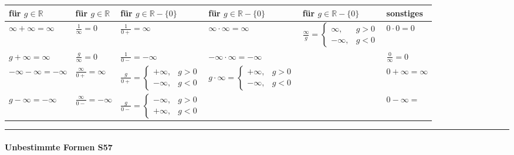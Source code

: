 		\begin{tabulary}{.5\textwidth}{L|L|L|L|L|L}
			für $g\in \mathbb R$	&	für $g\in \mathbb R$	&	für $g\in \mathbb R-\{0\}$	&	für $g\in \mathbb R-\{0\}$	&	für $g\in \mathbb R-\{0\}$ & sonstiges\\ \hline
			$\infty+\infty=\infty$	&$\frac{1}{\infty}=0$		&	$\frac{1}{0+}=\infty$& $\infty\cdot \infty=\infty$& $\frac{\infty}{g}= {\begin{cases} \infty, & g>0 \\ -\infty,& g<0 \end{cases}}$ & $0 \cdot 0 = 0$\\ 
						
			$g+\infty=\infty$		&$\frac{g}{\infty}=0$		&	$\frac{1}{0-}=-\infty$& $-\infty\cdot \infty=-\infty$ & & $\frac{0}{\infty} = 0$\\
			$-\infty-\infty=-\infty$&$\frac{\infty}{0+}=\infty$	& $\frac{g}{0+}= \begin{cases} +\infty, & g>0 \\ -\infty,& g<0 \end{cases}$ &
			$g\cdot \infty= \begin{cases} +\infty, & g>0 \\ -\infty,& g<0 \end{cases}$ & & $0+\infty=\infty$\\
			
			$g-\infty=-\infty$		&$\frac{\infty}{0-}=-\infty$& $\frac{g}{0-}= \begin{cases} -\infty, & g>0 \\ +\infty,& g<0 \end{cases}$ & & &$0-\infty=$\\		%
		\end{tabulary}
		\hrule
		\paragraph{Unbestimmte Formen {\color{red} S57}}\
		
